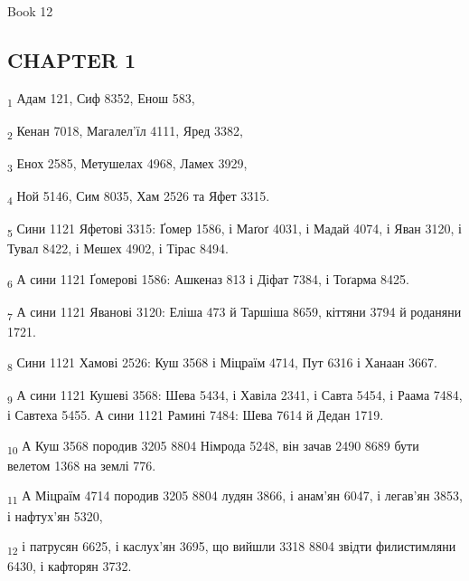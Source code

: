 Book 12
\subsection{CHAPTER 1}
\begin{tcolorbox}
\textsubscript{1} Адам 121, Сиф 8352, Енош 583,
\end{tcolorbox}
\begin{tcolorbox}
\textsubscript{2} Кенан 7018, Магалел'їл 4111, Яред 3382,
\end{tcolorbox}
\begin{tcolorbox}
\textsubscript{3} Енох 2585, Метушелах 4968, Ламех 3929,
\end{tcolorbox}
\begin{tcolorbox}
\textsubscript{4} Ной 5146, Сим 8035, Хам 2526 та Яфет 3315.
\end{tcolorbox}
\begin{tcolorbox}
\textsubscript{5} Сини 1121 Яфетові 3315: Ґомер 1586, і Маґоґ 4031, і Мадай 4074, і Яван 3120, і Тувал 8422, і Мешех 4902, і Тірас 8494.
\end{tcolorbox}
\begin{tcolorbox}
\textsubscript{6} А сини 1121 Ґомерові 1586: Ашкеназ 813 і Діфат 7384, і Тоґарма 8425.
\end{tcolorbox}
\begin{tcolorbox}
\textsubscript{7} А сини 1121 Яванові 3120: Еліша 473 й Таршіша 8659, кіттяни 3794 й роданяни 1721.
\end{tcolorbox}
\begin{tcolorbox}
\textsubscript{8} Сини 1121 Хамові 2526: Куш 3568 і Міцраїм 4714, Пут 6316 і Ханаан 3667.
\end{tcolorbox}
\begin{tcolorbox}
\textsubscript{9} А сини 1121 Кушеві 3568: Шева 5434, і Хавіла 2341, і Савта 5454, і Раама 7484, і Савтеха 5455. А сини 1121 Рамині 7484: Шева 7614 й Дедан 1719.
\end{tcolorbox}
\begin{tcolorbox}
\textsubscript{10} А Куш 3568 породив 3205 8804 Німрода 5248, він зачав 2490 8689 бути велетом 1368 на землі 776.
\end{tcolorbox}
\begin{tcolorbox}
\textsubscript{11} А Міцраїм 4714 породив 3205 8804 лудян 3866, і анам'ян 6047, і легав'ян 3853, і нафтух'ян 5320,
\end{tcolorbox}
\begin{tcolorbox}
\textsubscript{12} і патрусян 6625, і каслух'ян 3695, що вийшли 3318 8804 звідти филистимляни 6430, і кафторян 3732.
\end{tcolorbox}
